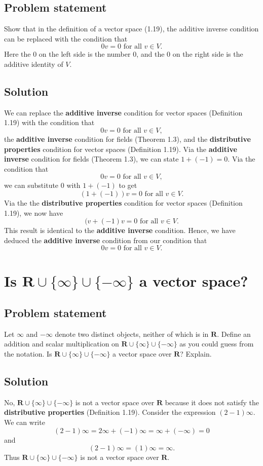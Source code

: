 \documentclass{article}
\begin{document}
\subsection*{Problem statement}
Show that in the definition of a vector space (1.19), the additive inverse condition can be replaced with the condition that
\[0v=0\text{ for all }v\in V.\]
Here the $0$ on the left side is the number $0$, and the $0$ on the right side is the additive identity of $V$.

\subsection*{Solution}
We can replace the \textbf{additive inverse} condition for vector spaces (Definition 1.19) with the condition that 
\[0v=0\text{ for all }v\in V,\]
the \textbf{additive inverse} condition for fields (Theorem 1.3), and the \textbf{distributive properties} condition for vector spaces (Definition 1.19). 
Via the \textbf{additive inverse} condition for fields (Theorem 1.3), we can state $1+(-1)=0$. 
Via the condition that 
\[0v=0\text{ for all }v\in V,\]
we can substitute $0$ with $1+(-1)$ to get
\[(1+(-1))v=0\text{ for all }v\in V.\]
Via the the \textbf{distributive properties} condition for vector spaces (Definition 1.19), we now have 
\[(v+(-1)v=0\text{ for all }v\in V.\]
This result is identical to the \textbf{additive inverse} condition. 
Hence, we have deduced the \textbf{additive inverse} condition from our condition that
\[0v=0\text{ for all }v\in V.\]

\clearpage

\renewcommand{\thesection}{6}
\section{Is $\mathbf{R}\cup\{\infty\}\cup\{-\infty\}$ a vector space?}
\subsection*{Problem statement}
Let $\infty$ and $-\infty$ denote two distinct objects, neither of which is in $\mathbf{R}$. 
Define an addition and scalar multiplication on $\mathbf{R}\cup\{\infty\}\cup\{-\infty\}$ as you could guess from the notation. 
Is $\mathbf{R}\cup\{\infty\}\cup\{-\infty\}$ a vector space over $\mathbf{R}$? 
Explain.

\subsection*{Solution}
No, $\mathbf{R}\cup\{\infty\}\cup\{-\infty\}$ is not a vector space over $\mathbf{R}$ because it does not satisfy the \textbf{distributive properties} (Definition 1.19). 
Consider the expression $(2-1)\infty$. 
We can write 
\[(2-1)\infty=2\infty+(-1)\infty=\infty+(-\infty)=0\]
and
\[(2-1)\infty=(1)\infty=\infty.\]
Thus $\mathbf{R}\cup\{\infty\}\cup\{-\infty\}$ is not a vector space over $\mathbf{R}$.
\end{document}
